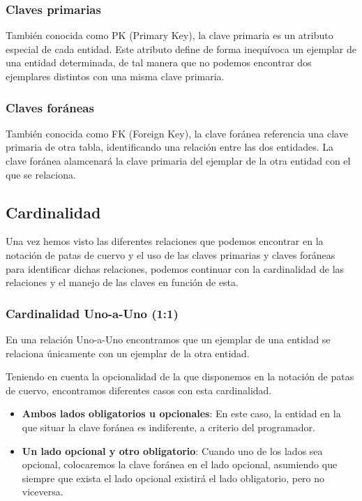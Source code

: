 \subsubsection{Claves primarias}
También conocida como PK (Primary Key), la clave primaria es un atributo especial de cada entidad. Este atributo define de forma inequívoca un ejemplar de una entidad determinada, de tal manera que no podemos encontrar dos ejemplares distintos con una misma clave primaria.

\subsubsection{Claves foráneas}
También conocida como FK (Foreign Key), la clave foránea referencia una clave primaria de otra tabla, identificando una relación entre las dos entidades. La clave foránea alamcenará la clave primaria del ejemplar de la otra entidad con el que se relaciona.

\subsection{Cardinalidad}
Una vez hemos visto las diferentes relaciones que podemos encontrar en la notación de patas de cuervo y el uso de las claves primarias y claves foráneas para identificar dichas relaciones, podemos continuar con la cardinalidad de las relaciones y el manejo de las claves en función de esta\cite{vert:cardin}.

\subsubsection{Cardinalidad Uno-a-Uno (1:1)}
En una relación Uno-a-Uno encontramos que un ejemplar de una entidad se relaciona únicamente con un ejemplar de la otra entidad.

Teniendo en cuenta la opcionalidad de la que disponemos en la notación de patas de cuervo, encontramos diferentes casos con esta cardinalidad.
\begin{itemize}
    \item \textbf{Ambos lados obligatorios u opcionales}: En este caso, la entidad en la que situar la clave foránea es indiferente, a criterio del programador.
    \item \textbf{Un lado opcional y otro obligatorio}: Cuando uno de los lados sea opcional, colocaremos la clave foránea en el lado opcional, asumiendo que siempre que exista el lado opcional existirá el lado obligatorio, pero no viceversa.
\end{itemize}

